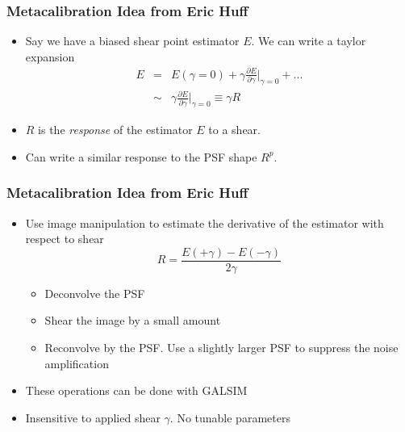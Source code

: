 \documentclass{beamer}
\begin{document}
\frame
{
    \frametitle{Metacalibration Idea from Eric Huff}

 

    {\Large
        \begin{itemize}
            \item Say we have a biased shear point estimator {\color{gold} $E$}.  We can write a taylor expansion
                {\color{mygray}
                    \begin{eqnarray}
                        E & = & E(\gamma=0) + \gamma \frac{\partial E}{\partial \gamma} \bigg|_{\gamma=0} + ... \nonumber \\
                          & \sim &  \gamma \frac{\partial E}{\partial \gamma}\bigg|_{\gamma=0}  \equiv \gamma R \nonumber 
                    \end{eqnarray}
                } 
            \item {\color{gold} $R$} is the {\em response} of the estimator $E$ to a shear.
            \item Can write a similar response to the PSF shape $R^p$.
        \end{itemize}
    }
}

\frame
{
    \frametitle{Metacalibration Idea from Eric Huff}


    \begin{itemize}

        \item Use image manipulation to estimate the derivative of the
            estimator with respect to shear
            {\color{gold}
                \begin{equation}
                    R = \frac{E(+\gamma) - E(-\gamma)}{2 \gamma} \nonumber 
                \end{equation}
            }
            \begin{itemize}
                \item Deconvolve the PSF
                \item Shear the image by a small amount
                \item Reconvolve by the PSF.  Use a slightly larger PSF to suppress
                    the noise amplification
            \end{itemize}

            \item These operations can be done with GALSIM
            \item Insensitive to applied shear $\gamma$.  {\color{lightskyblue} No tunable parameters}


    \end{itemize}

}
\end{document}
